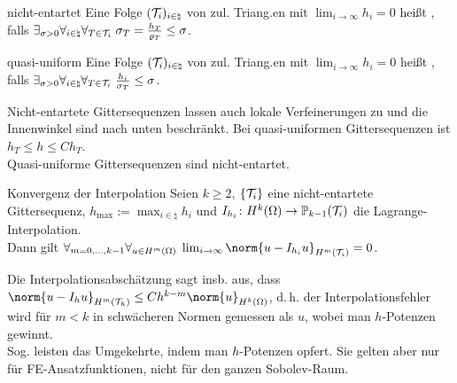 \linie

\begin{Def}{nicht-entartet}
    Eine Folge $(\mathcal{T}_i)_{i\in\natural}$ von zul. Triang.en mit $\lim_{i \to \infty} h_i = 0$
    heißt , falls
    $\exists_{\sigma>0} \forall_{i \in \natural} \forall_{T \in \mathcal{T}_i}\;
    \sigma_T = \frac{h_T}{\varrho_T} \le \sigma$.
\end{Def}

\begin{Def}{quasi-uniform}
    Eine Folge $(\mathcal{T}_i)_{i\in\natural}$ von zul. Triang.en mit $\lim_{i \to \infty} h_i = 0$
    heißt , falls
    $\exists_{\sigma>0} \forall_{i \in \natural} \forall_{T \in \mathcal{T}_i}\;
    \frac{h_i}{\sigma_T} \le \sigma$.
\end{Def}

\begin{Bem}
    Nicht-entartete Gittersequenzen lassen auch lokale Verfeinerungen zu und die
    Innenwinkel sind nach unten beschränkt.
    Bei quasi-uniformen Gittersequenzen ist $h_T \le h \le Ch_T$.\\
    Quasi-uniforme Gittersequenzen sind nicht-entartet.
\end{Bem}

\linie

\begin{Satz}{Konvergenz der Interpolation}
    Seien $k \ge 2$,
    $\{\mathcal{T}_i\}$ eine nicht-entartete Gittersequenz,
    $h_{\max} := \max_{i \in \natural} h_i$ und
    $I_{h_i}\colon H^k(\Omega) \to \mathbb{P}_{k-1}(\mathcal{T}_i)$ die Lagrange-Interpolation.\\
    Dann gilt $\forall_{m = 0, \dotsc, k - 1} \forall_{u \in H^m(\Omega)}\;
    \lim_{i \to \infty} \norm{u - I_{h_i} u}_{H^m(\T_i)} = 0$.
\end{Satz}

\linie

\begin{Bem}
    Die Interpolationsabschätzung sagt insb. aus, dass\\
    $\norm{u - I_h u}_{H^m(\T_h)} \le Ch^{k-m} \norm{u}_{H^k(\Omega)}$,
    d.\,h. der Interpolationsfehler wird für $m < k$ in schwächeren Normen gemessen als $u$,
    wobei man $h$-Potenzen gewinnt.\\
    Sog.  leisten das Umgekehrte, indem man $h$-Potenzen opfert.
    Sie gelten aber nur für FE-Ansatzfunktionen, nicht für den ganzen Sobolev-Raum.
\end{Bem}

